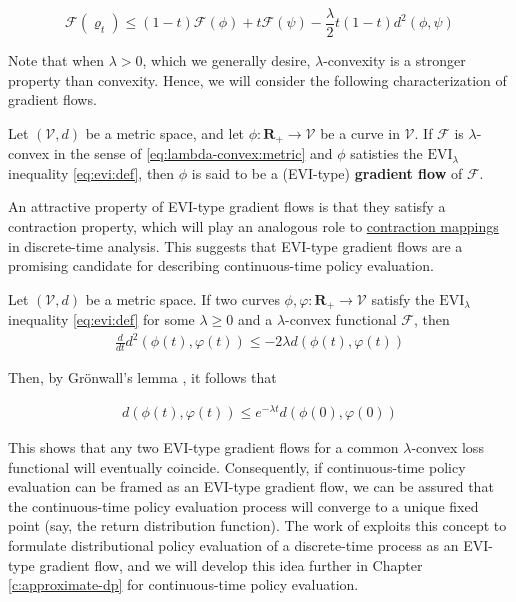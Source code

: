 \begin{equation}\label{eq:lambda-convex:metric}
  \mathscr{F}(\varrho_t) \leq (1 - t)\mathscr{F}(\phi) + t\mathscr{F}(\psi) -
  \frac{\lambda}{2}t(1 - t)d^2(\phi, \psi)
\end{equation}

Note that when $\lambda>0$, which we generally desire, $\lambda$-convexity is a
stronger property than convexity. Hence, we will consider the following
characterization of gradient flows.

\begin{definition}\label{def:abstract-gradient-flow}
  Let $(\mathcal{V}, d)$ be a metric space, and let
  $\phi:\mathbf{R}_+\to\mathcal{V}$ be a curve in $\mathcal{V}$. If
  $\mathcal{F}$ is $\lambda$-convex in the sense of
  \eqref{eq:lambda-convex:metric} and
  $\phi$ satisties the $\text{EVI}_\lambda$ inequality \eqref{eq:evi:def}, then
  $\phi$ is said to be a (EVI-type) \textbf{gradient flow} of $\mathscr{F}$.
\end{definition}

An attractive property of EVI-type gradient flows is that they satisfy a
contraction property, which will play an analogous role to
\hyperref[s:background:rl:contraction]{contraction mappings} in discrete-time
analysis. This suggests that EVI-type gradient flows are a promising candidate
for describing continuous-time policy evaluation.

\begin{theorem}
  Let $(\mathcal{V}, d)$ be a metric space. If two curves $\phi,\varphi :
  \mathbf{R}_+\to\mathcal{V}$ satisfy the $\text{EVI}_\lambda$ inequality
  \eqref{eq:evi:def} for some $\lambda\geq 0$ and a $\lambda$-convex functional
  $\mathscr{F}$, then
  \begin{align*}
    \frac{d}{dt}d^2(\phi(t), \varphi(t))\leq -2\lambda d(\phi(t), \varphi(t))
  \end{align*}

  Then, by Gr\"onwall's lemma \citep{gronwall1919note}, it follows that

  \begin{align*}
    d(\phi(t), \varphi(t)) \leq e^{-\lambda t}d(\phi(0), \varphi(0))
  \end{align*}
\end{theorem}

This shows that any two EVI-type gradient flows for a common $\lambda$-convex
loss functional will eventually coincide. Consequently, if continuous-time
policy evaluation can be framed as an EVI-type gradient flow, we can be assured
that the continuous-time policy evaluation process will converge to a unique
fixed point (say, the return distribution function). The work of
\citet{martin2019stochastically} exploits this concept to formulate
distributional policy evaluation of a discrete-time process as an EVI-type
gradient flow, and we will develop this idea further in Chapter
\ref{c:approximate-dp} for continuous-time policy evaluation.

